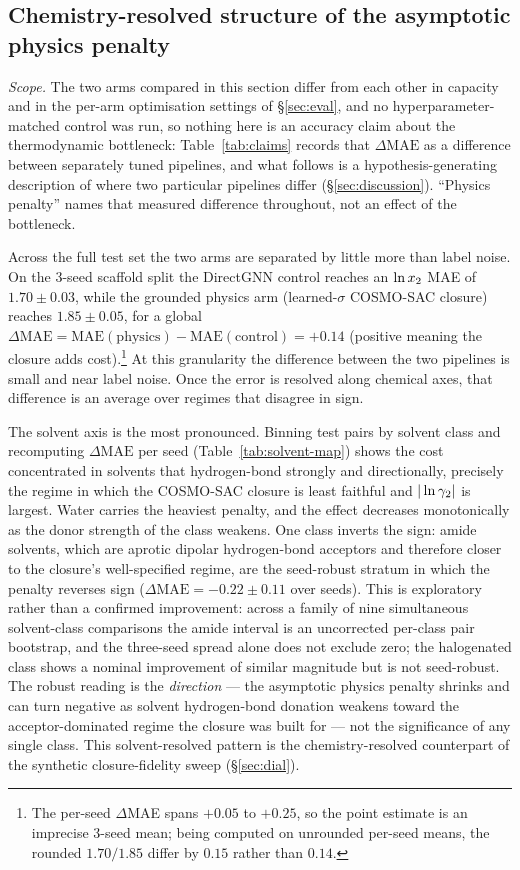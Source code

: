 \subsection{Chemistry-resolved structure of the asymptotic physics penalty} \label{sec:map}

\emph{Scope.} The two arms compared in this section differ from each other in capacity and in the
per-arm optimisation settings of \S\ref{sec:eval}, and no hyperparameter-matched control was
run, so nothing here is an accuracy claim about the thermodynamic bottleneck:
Table~\ref{tab:claims} records that $\Delta\mathrm{MAE}$ as a difference between separately tuned
pipelines, and what follows is a
hypothesis-generating description of where two particular pipelines differ
(\S\ref{sec:discussion}). ``Physics penalty'' names that measured difference throughout, not an
effect of the bottleneck.

Across the full test set the two arms are separated by little more than label noise. On the 3-seed scaffold split the DirectGNN control reaches an $\ln x_2$ MAE of $1.70 \pm 0.03$, while the grounded physics arm (learned-$\sigma$ COSMO-SAC closure) reaches $1.85 \pm 0.05$, for a global $\Delta\mathrm{MAE} = \mathrm{MAE(physics)} - \mathrm{MAE(control)} = +0.14$ (positive meaning the closure adds cost).\footnote{The per-seed $\Delta$MAE spans $+0.05$ to $+0.25$, so the point estimate is an imprecise 3-seed mean; being computed on unrounded per-seed means, the rounded $1.70/1.85$ differ by $0.15$ rather than $0.14$.} At this granularity the difference between the two pipelines is small and near label noise. Once the error is resolved along chemical axes, that difference is an average over regimes that disagree in sign.

The solvent axis is the most pronounced. Binning test pairs by solvent class and recomputing $\Delta\mathrm{MAE}$ per seed (Table~\ref{tab:solvent-map}) shows the cost concentrated in solvents that hydrogen-bond strongly and directionally, precisely the regime in which the COSMO-SAC closure is least faithful and $|\ln\gamma_2|$ is largest. Water carries the heaviest penalty, and the effect decreases monotonically as the donor strength of the class weakens. One class inverts the sign: amide solvents, which are aprotic dipolar hydrogen-bond acceptors and therefore closer to the closure's well-specified regime, are the seed-robust stratum in which the penalty reverses sign ($\Delta\mathrm{MAE}=-0.22 \pm 0.11$ over seeds). This is exploratory rather than a confirmed improvement: across a family of nine simultaneous solvent-class comparisons the amide interval is an uncorrected per-class pair bootstrap, and the three-seed spread alone does not exclude zero; the halogenated class shows a nominal improvement of similar magnitude but is not seed-robust. The robust reading is the \emph{direction} --- the asymptotic physics penalty shrinks and can turn negative as solvent hydrogen-bond donation weakens toward the acceptor-dominated regime the closure was built for --- not the significance of any single class. This solvent-resolved pattern is the chemistry-resolved counterpart of the synthetic closure-fidelity sweep (\S\ref{sec:dial}).

